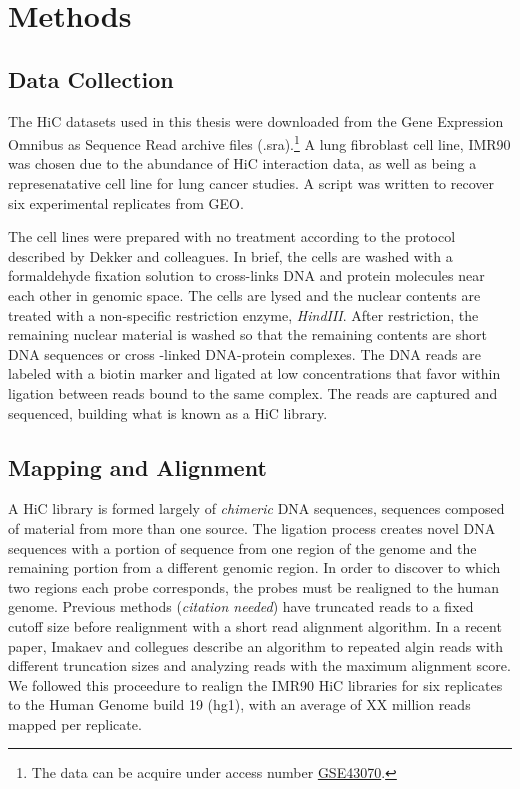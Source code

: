 \documentclass[phd,tocprelim]{cornell}
\begin{document}
\chapter{Methods}

\section{Data Collection}

The HiC datasets used in this thesis were downloaded from the Gene
Expression Omnibus as Sequence Read archive files
(.sra).\footnote{The data can be acquire under access number \href{http://www.ncbi.nlm.nih.gov/geo/query/acc.cgi?acc=GSE43070}{GSE43070}.\cite{ren2013}}
A lung fibroblast cell line, IMR90 was chosen due to the abundance of
HiC interaction data, as well as being a represenatative cell line
for lung cancer studies.  A script was written to recover six experimental
replicates from GEO.

The cell lines were prepared with no treatment according to the protocol
described by Dekker and colleagues\cite{dekker2013}.  In brief, the cells
are washed with a formaldehyde fixation solution to cross-links
DNA and protein molecules near each other in genomic space.  The cells are
lysed and the nuclear contents are treated with a non-specific restriction
enzyme, \textit{HindIII}.  After restriction, the remaining nuclear material
is washed so that the remaining contents are short DNA sequences or cross
-linked DNA-protein complexes.  The DNA reads are labeled with a biotin
marker and ligated at low concentrations that favor within ligation between
reads bound to the same complex.  The reads are captured and sequenced,
building what is known as a HiC library.





\section{Mapping and Alignment}

A HiC library is formed largely of \textit{chimeric} DNA sequences,
sequences composed of material from more than one source.  The ligation process
creates novel DNA sequences with a portion of sequence from one region of
the genome and the remaining portion from a different genomic region.  In
order to discover to which two regions each probe corresponds, the probes
must be realigned to the human genome.  Previous methods (\textit{citation needed})
have truncated reads to a fixed cutoff size before realignment with a short
read alignment algorithm.  In a recent paper, Imakaev and collegues
describe an algorithm to repeated algin reads with different truncation sizes
and analyzing reads with the maximum alignment score\cite{imakaev2012}.  We followed
this proceedure to realign the IMR90 HiC libraries for six replicates to
the Human Genome build 19 (hg1), with an average of XX million reads
mapped per replicate.
\end{document}
